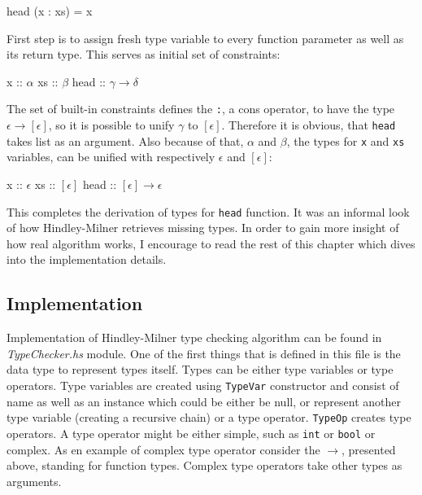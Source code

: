 \documentclass[12pt,a4paper]{report}
\begin{document}
\vspace*{0.2in}
\begin{code}[style=haskell]
head (x : xs) = x
\end{code}

First step is to assign fresh type variable to every function parameter as
well as its return type. This serves as initial set of constraints:

\vspace*{0.2in}
\begin{code}[mathescape=true,style=haskell]
  x :: $\alpha$
  xs :: $\beta$
  head :: $\gamma \rightarrow \delta$
\end{code}

The set of built-in constraints defines the \texttt{:}, a cons operator, to
have the type $\epsilon \rightarrow [\epsilon]$, so it is possible to unify
$\gamma$ to $[\epsilon]$. Therefore it is obvious, that \texttt{head} takes
list as an argument. Also because of that, $\alpha$ and $\beta$, the types for
\texttt{x} and \texttt{xs} variables, can be unified with respectively
$\epsilon$ and $[\epsilon]$:

\vspace*{0.2in}
\begin{code}[mathescape=true,style=haskell]
  x :: $\epsilon$
  xs :: $[\epsilon]$
  head :: $[\epsilon] \rightarrow \epsilon$
\end{code}

This completes the derivation of types for \texttt{head} function. It was an
informal look of how Hindley-Milner retrieves missing types. In order to gain
more insight of how real algorithm works, I encourage to read the rest of this
chapter which dives into the implementation details.

\subsection{Implementation}
Implementation of Hindley-Milner type checking algorithm can be found in
\textit{TypeChecker.hs} module. One of the first things that is defined in this
file is the data type to represent types itself. Types can be either type
variables or type operators. Type variables are created using \texttt{TypeVar}
constructor and consist of name as well as an instance which could be either be
null, or represent another type variable (creating a recursive chain) or a type
operator. \texttt{TypeOp} creates type operators. A type operator might
be either simple, such as \texttt{int} or \texttt{bool} or complex. As en
example of complex type operator consider the $\rightarrow$, presented
above, standing for function types. Complex type operators take other types as
arguments.
\end{document}
